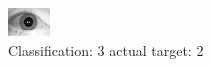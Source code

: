\begin{figure}[h!]
\begin{center}
\includegraphics[width=0.60\columnwidth]{figures/ID1617_class_3_target_2.png}
\end{center}
\caption{ Classification: 3 actual target: 2}
\label{fig:ID1617_class_3_target_2}
\end{figure}
